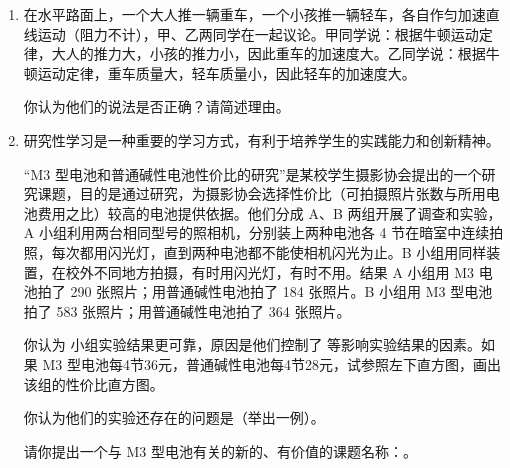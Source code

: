 \documentclass[\gkver]{gaokaozhenti}
\begin{document}
\begin{enumerate}
{（3）产生误差的主要原因：太阳能没有全部被水吸收，或水吸收的太阳能还有一部分损失等。
}

\item
在水平路面上，一个大人推一辆重车，一个小孩推一辆轻车，各自作匀加速直线运动（阻力不计），甲、乙两同学在一起议论。甲同学说：根据牛顿运动定律，大人的推力大，小孩的推力小，因此重车的加速度大。乙同学说：根据牛顿运动定律，重车质量大，轻车质量小，因此轻车的加速度大。

你认为他们的说法是否正确？请简述理由。



\item
研究性学习是一种重要的学习方式，有利于培养学生的实践能力和创新精神。

“M3 型电池和普通碱性电池性价比的研究”是某校学生摄影协会提出的一个研究课题，目的是通过研究，为摄影协会选择性价比（可拍摄照片张数与所用电池费用之比）较高的电池提供依据。他们分成 A、B 两组开展了调查和实验，A 小组利用两台相同型号的照相机，分别装上两种电池各 4 节在暗室中连续拍照，每次都用闪光灯，直到两种电池都不能使相机闪光为止。B 小组用同样装置，在校外不同地方拍摄，有时用闪光灯，有时不用。结果 A 小组用 M3 电池拍了 290 张照片；用普通碱性电池拍了 184 张照片。B 小组用 M3 型电池拍了 583 张照片；用普通碱性电池拍了 364 张照片。

你认为  小组实验结果更可靠，原因是他们控制了  等影响实验结果的因素。如果 M3 型电池每4节36元，普通碱性电池每4节28元，试参照左下直方图，画出该组的性价比直方图。


你认为他们的实验还存在的问题是（举出一例）。

请你提出一个与 M3 型电池有关的新的、有价值的课题名称：。


\end{enumerate}
\end{document}
